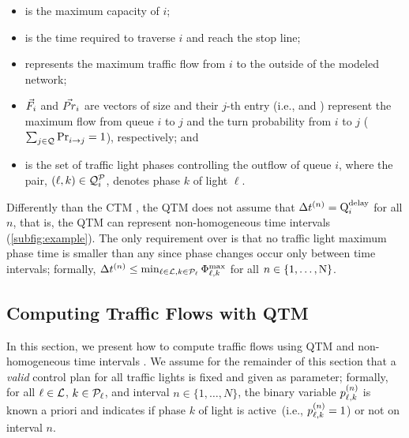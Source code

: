 \begin{itemize}
%
\item {} is the maximum capacity of $i$;
%
\item {} is the time required to traverse $i$ and reach the stop line;
%
\item {} represents the maximum traffic flow from $i$ to the outside of
  the modeled network;
%
\item $\Fvec_i$ and $\Prvec_i$ are vectors of size \Qn and their $j$-th entry
  (i.e.,  and ) represent the maximum flow from queue $i$
  to $j$ and the turn probability from $i$ to $j$ ( $\sum_{j \in
  \Qset}\FTURN{i}{j} = 1$), respectively; and
%
\item {} is the set of  traffic light phases controlling the outflow
  of queue $i$, where the pair, $\left(\ell,k \right) \in \QPset{i}$, denotes phase $k$
  of light $\ell$.
%
\end{itemize}


Differently than the CTM \cite{daganzo1994cell,lin2004enhanced}, the QTM does not assume
that $\DT[n] = \QDELAY{i}$ for all $n$, that is, the QTM can represent
non-homogeneous time intervals (\cref{subfig:example}).
%
The only requirement over \DT[n] is that no traffic light maximum phase time is
smaller than any \DT[n] since phase changes occur only between time intervals;
formally, $\DT[n] \le \min_{\tl \in \Lset, k \in \Pset_\tl} \PTMAX{\tl}{k}$ for
all $n \in \{1,\dots,\Nn\}$.
%



\subsection{Computing Traffic Flows with QTM}

In this section, we present how to compute traffic flows using QTM and
non-homogeneous time intervals \DT[].
%
We assume for the remainder of this section that a \emph{valid} control plan for
all traffic lights is fixed and given as parameter;
%
formally, for all $\tl \in \Lset$, $k \in \Pset_\tl$, and interval $n \in
\{1,\dots,N\}$, the binary variable $\p{\tl}{k}$ is known a priori and indicates
if phase $k$ of light \tl is active~(i.e., $\p{\tl}{k} = 1$) or not on interval
$n$. 


